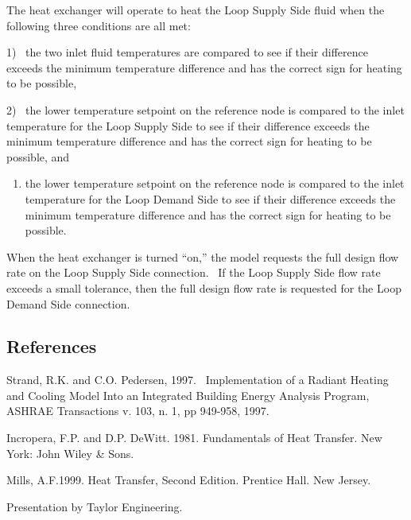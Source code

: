 The heat exchanger will operate to heat the Loop Supply Side fluid when the following three conditions are all met:

1)~ the two inlet fluid temperatures are compared to see if their difference exceeds the minimum temperature difference and has the correct sign for heating to be possible,

2)~ the lower temperature setpoint on the reference node is compared to the inlet temperature for the Loop Supply Side to see if their difference exceeds the minimum temperature difference and has the correct sign for heating to be possible, and

\begin{enumerate}
\def\labelenumi{\arabic{enumi})}
\setcounter{enumi}{2}
\tightlist
\item
  the lower temperature setpoint on the reference node is compared to the inlet temperature for the Loop Demand Side to see if their difference exceeds the minimum temperature difference and has the correct sign for heating to be possible.
\end{enumerate}

When the heat exchanger is turned ``on,'' the model requests the full design flow rate on the Loop Supply Side connection.~ If the Loop Supply Side flow rate exceeds a small tolerance, then the full design flow rate is requested for the Loop Demand Side connection.

\subsection{References}\label{references-5-002}

Strand, R.K. and C.O. Pedersen, 1997.~ Implementation of a Radiant Heating and Cooling Model Into an Integrated Building Energy Analysis Program, ASHRAE Transactions v. 103, n. 1, pp 949-958, 1997.

Incropera, F.P. and D.P. DeWitt. 1981. Fundamentals of Heat Transfer. New York: John Wiley \& Sons.

Mills, A.F.1999. Heat Transfer, Second Edition. Prentice Hall. New Jersey.

Presentation by Taylor Engineering.

